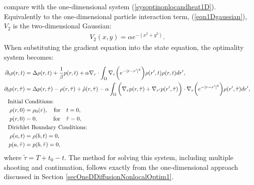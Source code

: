 compare with the one-dimensional system (\ref{sysoptinonlocandheat1D}).
Equivalently to the one-dimensional particle interaction term, (\ref{eqn1Dgaussian}), $V_2$ is the two-dimensional Gaussian:
\begin{align*}
V_2(x,y)= \alpha e^{-(x^2 +y^2)}.
\end{align*}
When substituting the gradient equation into the state equation, the optimality system becomes:
\begin{align}\label{OptmSysNonloc1alpha2D}
\partial_t \rho(r,t) &= \Delta\rho(r,t) + \frac{1}{\beta}{p}(r,t) + \alpha \nabla_r \cdot  \int_\Omega \nabla_r\bigg(  e^{-|r-r'|^2} \bigg)\rho(r',t)\rho(r,t)dr', \\
\partial_t {p}(r,\tilde\tau) &=\Delta {p}(r,\tilde\tau) - \rho(r,\tilde\tau) +\hat{\rho}(r,\tilde\tau) - \alpha\int_\Omega \bigg(\nabla_r  p(r,\tilde\tau)+\nabla_{r'}  p(r',\tilde\tau)\bigg) \cdot \nabla_r \bigg(  e^{-|r-r'|^2} \bigg)\rho(r',\tilde\tau)  dr', \notag \\
\text{Initial } & \text{Conditions:} \notag  \\
\rho(r,0)&=\rho_0(r), \quad \text{for}  \quad t=0, \notag \\
{p}(r,0) &=0,\quad \ \ \quad \text{for} \quad \tilde \tau=0, \notag \\
\text{Dirichl}&\text{et Boundary Conditions:} \notag \\
\rho(a,t) &=\rho(b,t)=0, \notag \\
{p}(a,\tilde\tau) &={p}(b,\tilde\tau)=0, \notag 
\end{align}
where $\tilde \tau= T+t_0 -t$. 
The method for solving this system, including multiple shooting and continuation, follows exactly from the one-dimensional approach discussed in Section \ref{secOneDDiffusionNonlocalOptim1}.